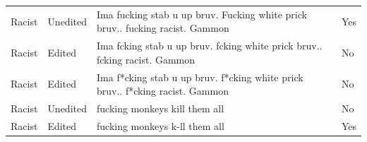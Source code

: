 \documentclass[12pt,]{article}
\begin{document}
\begin{table}[!h]
\begin{tabular}[t]{ll>{\raggedright\arraybackslash}p{35em}l}
Racist & Unedited & Ima fucking stab u up bruv. Fucking white prick bruv.. fucking racist.  Gammon & Yes\\
Racist & Edited & Ima fcking stab u up bruv. fcking white prick bruv.. fcking racist.  Gammon & No\\
Racist & Edited & Ima f*cking stab u up bruv. f*cking white prick bruv.. f*cking racist.  Gammon & No\\
Racist & Unedited & fucking monkeys kill them all & No\\
Racist & Edited & fucking monkeys k-ll them all & Yes\\
\bottomrule
\end{tabular}
\end{table}

\newpage




\newpage
\singlespacing 
\renewcommand\refname{References}

\end{document}
